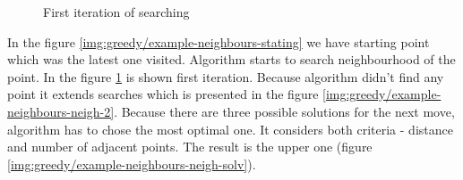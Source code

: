 \documentclass[titlepage]{article}
\newcommand{\multifigcaption}{\captionsetup{justification=justified}}
\begin{document}
\begin{figure}[H]
\begin{center}
\begin{minipage}{.45\linewidth}
 			\multifigcaption
 			\caption{First iteration of searching \newline \vspace{4mm}}
 			\label{img:greedy/example-neighbours-neigh-1} 
 		\end{minipage}
	\end{center}
\end{figure}

In the figure \ref{img:greedy/example-neighbours-stating} we have starting point which was the latest one visited. Algorithm starts to search neighbourhood of the point. In the figure \ref{img:greedy/example-neighbours-neigh-1} is shown first iteration. Because algorithm didn't find any point it extends searches which is presented in the figure \ref{img:greedy/example-neighbours-neigh-2}. Because there are three possible solutions for the next move, algorithm has to chose the most optimal one. It considers both criteria - distance and number of adjacent points. The result is the upper one (figure \ref{img:greedy/example-neighbours-neigh-solv}).
\end{document}
